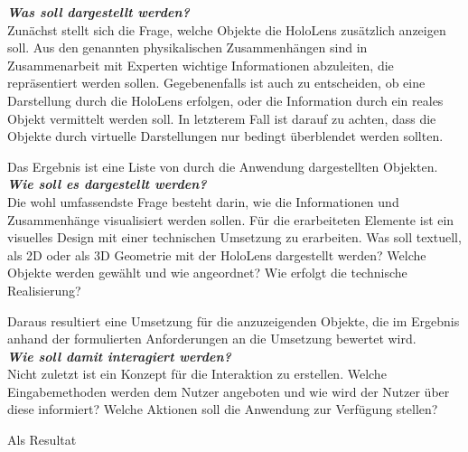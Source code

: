\textbf{\textit{Was soll dargestellt werden?}}\\
Zunächst stellt sich die Frage, welche Objekte die HoloLens zusätzlich anzeigen soll. Aus den genannten physikalischen Zusammenhängen sind in Zusammenarbeit mit Experten wichtige Informationen abzuleiten, die repräsentiert werden sollen. Gegebenenfalls ist auch zu entscheiden, ob eine Darstellung durch die HoloLens erfolgen, oder die Information durch ein reales Objekt vermittelt werden soll. In letzterem Fall ist darauf zu achten, dass die Objekte durch virtuelle Darstellungen nur bedingt überblendet werden sollten.
\par
\noindent\hspace*{5mm}
Das Ergebnis ist eine Liste von durch die Anwendung dargestellten Objekten.\\


\textbf{\textit{Wie soll es dargestellt werden?}}\\
Die wohl umfassendste Frage besteht darin, wie die Informationen und Zusammenhänge visualisiert werden sollen. Für die erarbeiteten Elemente ist ein visuelles Design mit einer technischen Umsetzung zu erarbeiten. Was soll textuell, als 2D oder als 3D Geometrie mit der HoloLens dargestellt werden? Welche Objekte werden gewählt und wie angeordnet? Wie erfolgt die technische Realisierung?
\par
\noindent\hspace*{5mm}
Daraus resultiert eine Umsetzung für die anzuzeigenden Objekte, die im Ergebnis anhand der formulierten Anforderungen an die Umsetzung bewertet wird.\\

\textbf{\textit{Wie soll damit interagiert werden?}}\\
Nicht zuletzt ist ein Konzept für die Interaktion zu erstellen. Welche Eingabemethoden werden dem Nutzer angeboten und wie wird der Nutzer über diese informiert? Welche Aktionen soll die Anwendung zur Verfügung stellen?
\par
\noindent\hspace*{5mm}
Als Resultat 

